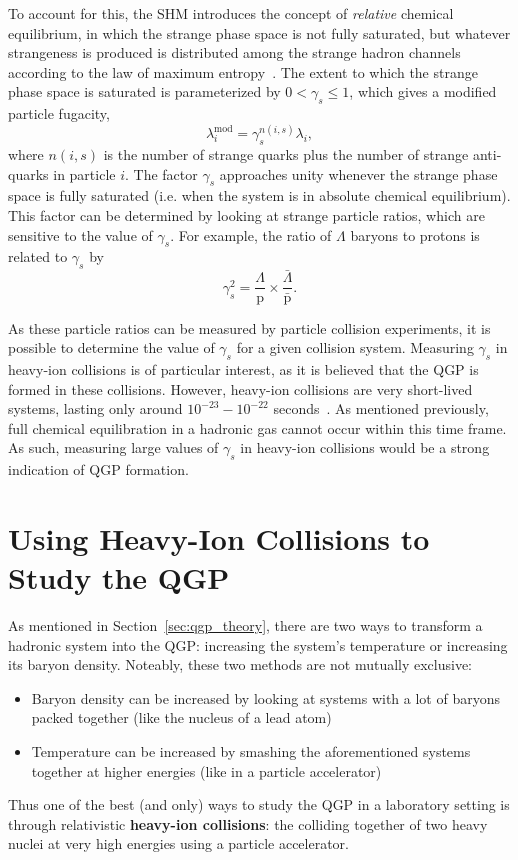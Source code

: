 To account for this, the SHM introduces the concept of \textit{relative} chemical equilibrium, in which the strange phase space is not fully saturated, but whatever strangeness is produced is distributed among the strange hadron channels according to the law of maximum entropy~\cite{StrangenessFireball}. The extent to which the strange phase space is saturated is parameterized by $0 < \gamma_s \leq 1$, which gives a modified particle fugacity,
%
\begin{equation}
    \label{eq:modified_fugacity}
    \lambda_i^{\text{mod}} = \gamma_s^{n(i, s)} \lambda_i,
\end{equation}
%
where $n(i, s)$ is the number of strange quarks plus the number of strange anti-quarks in particle $i$. The factor $\gamma_s$ approaches unity whenever the strange phase space is fully saturated (i.e. when the system is in absolute chemical equilibrium). This factor can be determined by looking at strange particle ratios, which are sensitive to the value of $\gamma_s$. For example, the ratio of $\Lambda$ baryons to protons is related to $\gamma_s$ by~\cite{RafelskiSHM}
%
\begin{equation}
    \label{eq:gamma_s}
    \gamma_s^2 = \frac{\Lambda}{\text{p}} \times \frac{\bar{\Lambda}}{\bar{\text{p}}}.
\end{equation}
%

As these particle ratios can be measured by particle collision experiments, it is possible to determine the value of $\gamma_s$ for a given collision system. Measuring $\gamma_s$ in heavy-ion collisions is of particular interest, as it is believed that the QGP is formed in these collisions. However, heavy-ion collisions are very short-lived systems, lasting only around $10^{-23} - 10^{-22}$ seconds~\cite{QGPFormation}. As mentioned previously, full chemical equilibration in a hadronic gas cannot occur within this time frame. As such, measuring large values of $\gamma_s$ in heavy-ion collisions would be a strong indication of QGP formation.

\clearpage

\section{Using Heavy-Ion Collisions to Study the QGP}
\label{sec:heavy_ion_collisions}

As mentioned in Section~\ref{sec:qgp_theory}, there are two ways to transform a hadronic system into the QGP: increasing the system's temperature or increasing its baryon density. Noteably, these two methods are not mutually exclusive: 
\begin{itemize}
    \item Baryon density can be increased by looking at systems with a lot of baryons packed together (like the nucleus of a lead atom)
    \item Temperature can be increased by smashing the aforementioned systems together at higher energies (like in a particle accelerator)
\end{itemize}
Thus one of the best (and only) ways to study the QGP in a laboratory setting is through relativistic \textbf{heavy-ion collisions}: the colliding together of two heavy nuclei at very high energies using a particle accelerator. 

